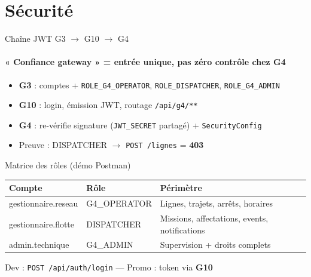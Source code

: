 \documentclass[aspectratio=169,t]{beamer}
\begin{document}
\section{Sécurité}

\begin{frame}{Chaîne JWT G3 $\rightarrow$ G10 $\rightarrow$ G4}
  \framesubtitle{« Confiance gateway » = entrée unique, pas zéro contrôle chez G4}

  \begin{center}
  \end{center}

  \small
  \begin{itemize}
    \item \textbf{G3} : comptes + \texttt{ROLE\_G4\_OPERATOR}, \texttt{ROLE\_DISPATCHER}, \texttt{ROLE\_G4\_ADMIN}
    \item \textbf{G10} : login, émission JWT, routage \texttt{/api/g4/**}
    \item \textbf{G4} : re-vérifie signature (\texttt{JWT\_SECRET} partagé) + \texttt{SecurityConfig}
    \item Preuve : DISPATCHER $\rightarrow$ \texttt{POST /lignes} = \textbf{403}
  \end{itemize}
\end{frame}

\begin{frame}{Matrice des rôles (démo Postman)}
  \small
  \begin{table}
    \begin{tabular}{@{}llp{5.8cm}@{}}
      \toprule
      \textbf{Compte} & \textbf{Rôle} & \textbf{Périmètre} \\
      \midrule
      gestionnaire.reseau & G4\_OPERATOR & Lignes, trajets, arrêts, horaires \\
      \rowcolor{RowHL}
      gestionnaire.flotte & DISPATCHER & Missions, affectations, events, notifications \\
      admin.technique & G4\_ADMIN & Supervision + droits complets \\
      \bottomrule
    \end{tabular}
  \end{table}
  \vfill
  \centering Dev : \texttt{POST /api/auth/login} — Promo : token via \textbf{G10}
\end{frame}
\end{document}
